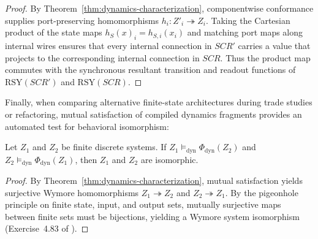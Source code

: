 \begin{proof}
By Theorem~\ref{thm:dynamics-characterization}, componentwise conformance supplies port-preserving homomorphisms $h_i:Z'_i\twoheadrightarrow Z_i$. Taking the Cartesian product of the state maps $h_S(x)_i=h_{S,i}(x_i)$ and matching port maps along internal wires ensures that every internal connection in $SCR'$ carries a value that projects to the corresponding internal connection in $SCR$. Thus the product map commutes with the synchronous resultant transition and readout functions of $\mathrm{RSY}(SCR')$ and $\mathrm{RSY}(SCR)$.
\end{proof}

Finally, when comparing alternative finite-state architectures during trade studies or refactoring, mutual satisfaction of compiled dynamics fragments provides an automated test for behavioral isomorphism:

\begin{theorem}
\label{thm:finite-canonicity}
Let $Z_1$ and $Z_2$ be finite discrete systems. If $Z_1\models_{\mathrm{dyn}}\Phi_{\mathrm{dyn}}(Z_2)$ and $Z_2\models_{\mathrm{dyn}}\Phi_{\mathrm{dyn}}(Z_1)$, then $Z_1$ and $Z_2$ are isomorphic.
\end{theorem}

\begin{proof}
By Theorem~\ref{thm:dynamics-characterization}, mutual satisfaction yields surjective Wymore homomorphisms $Z_1\twoheadrightarrow Z_2$ and $Z_2\twoheadrightarrow Z_1$. By the pigeonhole principle on finite state, input, and output sets, mutually surjective maps between finite sets must be bijections, yielding a Wymore system isomorphism (Exercise~4.83 of \citet{Wymore1993}). %
\end{proof}
